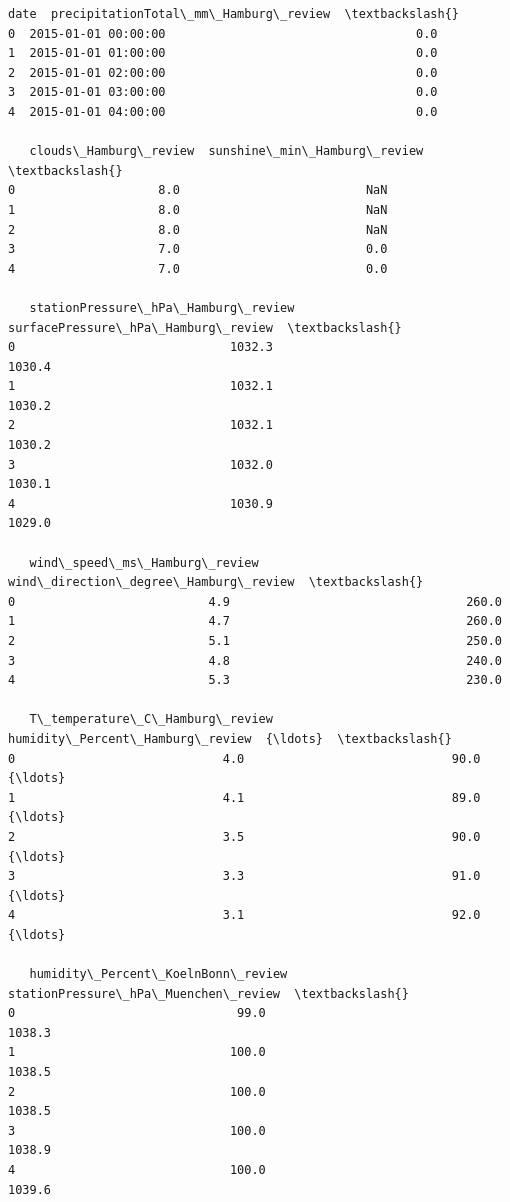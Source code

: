\documentclass[a4paper]{article}
\begin{document}
    \begin{small}
\begin{Verbatim}[commandchars=\\\{\}]
                  date  precipitationTotal\_mm\_Hamburg\_review  \textbackslash{}
0  2015-01-01 00:00:00                                   0.0
1  2015-01-01 01:00:00                                   0.0
2  2015-01-01 02:00:00                                   0.0
3  2015-01-01 03:00:00                                   0.0
4  2015-01-01 04:00:00                                   0.0

   clouds\_Hamburg\_review  sunshine\_min\_Hamburg\_review  \textbackslash{}
0                    8.0                          NaN
1                    8.0                          NaN
2                    8.0                          NaN
3                    7.0                          0.0
4                    7.0                          0.0

   stationPressure\_hPa\_Hamburg\_review  surfacePressure\_hPa\_Hamburg\_review  \textbackslash{}
0                              1032.3                              1030.4
1                              1032.1                              1030.2
2                              1032.1                              1030.2
3                              1032.0                              1030.1
4                              1030.9                              1029.0

   wind\_speed\_ms\_Hamburg\_review  wind\_direction\_degree\_Hamburg\_review  \textbackslash{}
0                           4.9                                 260.0
1                           4.7                                 260.0
2                           5.1                                 250.0
3                           4.8                                 240.0
4                           5.3                                 230.0

   T\_temperature\_C\_Hamburg\_review  humidity\_Percent\_Hamburg\_review  {\ldots}  \textbackslash{}
0                             4.0                             90.0  {\ldots}
1                             4.1                             89.0  {\ldots}
2                             3.5                             90.0  {\ldots}
3                             3.3                             91.0  {\ldots}
4                             3.1                             92.0  {\ldots}

   humidity\_Percent\_KoelnBonn\_review  stationPressure\_hPa\_Muenchen\_review  \textbackslash{}
0                               99.0                               1038.3
1                              100.0                               1038.5
2                              100.0                               1038.5
3                              100.0                               1038.9
4                              100.0                               1039.6


\end{Verbatim}
\end{small}
\end{document}
